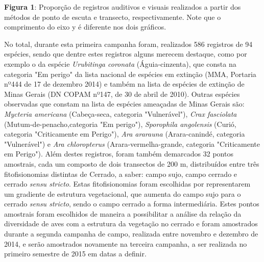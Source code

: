 \textbf{Figura 1}: Proporção de registros auditivos e visuais realizados a partir dos métodos de ponto de escuta e transecto, respectivamente. Note que o comprimento do eixo y é diferente nos dois gráficos.

No total, durante esta primeira campanha foram, realizados 586 registros de 94 espécies, sendo que dentre estes registros alguns merecem destaque, como por exemplo o da espécie \textit{Urubitinga coronata} (Águia-cinzenta), que consta na categoria "Em perigo" da lista nacional de espécies em extinção (MMA, Portaria nº444 de 17 de dezembro 2014) e também na lista de espécies de extinção de Minas Gerais (DN COPAM nº147, de 30 de abril de 2010). Outras espécies observadas que constam na lista de espécies ameaçadas de Minas Gerais são: \textit{Mycteria americana} (Cabeça-seca, categoria "Vulnerável"), \textit{Crax fasciolata} (Mutum-de-penacho,categoria "Em perigo"), \textit{Sporophila angolensis} (Curió, categoria "Criticamente em Perigo"), \textit{Ara ararauna}  (Arara-canindé, categoria "Vulnerável") e \textit{Ara chloropterus} (Arara-vermelha-grande, categoria "Criticamente em Perigo").
Além destes registros, foram também demarcados 32 pontos amostrais, cada um composto de dois transectos de 200 m, distribuídos entre três fitofisionomias distintas de Cerrado, a saber: campo sujo, campo cerrado e cerrado \textit{sensu stricto}. Estas fitofisionomias foram escolhidas por representarem um gradiente de estrutura vegetacional, que aumenta do campo sujo para o cerrado \textit{sensu stricto}, sendo o campo cerrado a forma intermediária. Estes pontos amostrais foram escolhidos de maneira a possibilitar a análise da relação da diversidade de aves com a estrutura da vegetação no cerrado e foram amostrados durante a segunda campanha de campo, realizada entre novembro e dezembro de 2014, e serão amostrados novamente na terceira campanha, a ser realizada no primeiro semestre de 2015 em datas a definir.

